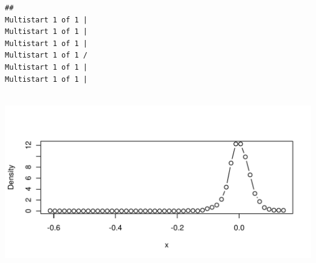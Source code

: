 \begin{knitrout}
\color{fgcolor}\begin{kframe}
\begin{alltt}
 \hlkwb{<-} \hlstd{(}
  
  \hlstd{=} \hlstd{,}
  \hlstd{=} 
\hlstd{)}
\end{alltt}
\begin{verbatim}
## 
Multistart 1 of 1 |
Multistart 1 of 1 |
Multistart 1 of 1 |
Multistart 1 of 1 /
Multistart 1 of 1 |
Multistart 1 of 1 |
                   
\end{verbatim}
\begin{alltt}
 \hlkwb{<-} 

  \hlstd{=} \hlstd{)}
\end{alltt}
\end{kframe}
\includegraphics[width=\maxwidth]{figure/unnamed-chunk-30-1} 

\end{knitrout}
